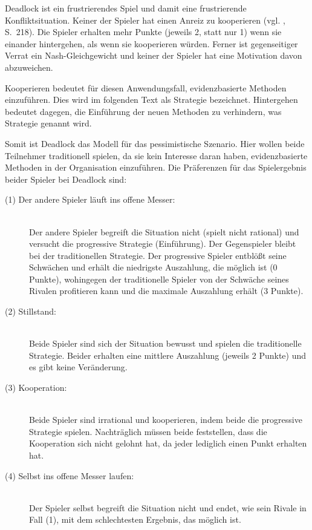 Deadlock ist ein frustrierendes Spiel und damit eine frustrierende Konfliktsituation. Keiner der Spieler hat einen Anreiz
zu kooperieren (vgl. \cite{Poundstone}, S.~218). Die Spieler erhalten mehr Punkte (jeweils 2, statt nur 1) wenn sie einander hintergehen,
als wenn sie kooperieren würden. Ferner ist gegenseitiger Verrat ein Nash-Gleichgewicht und keiner der Spieler hat eine Motivation davon
abzuweichen.

Kooperieren bedeutet für diesen Anwendungsfall, evidenzbasierte Methoden einzuführen. Dies wird im
folgenden Text als \grqq{} Strategie bezeichnet. Hintergehen bedeutet dagegen, die
Einführung der neuen Methoden zu verhindern, was \grqq{} Strategie genannt wird.
 
Somit ist Deadlock das Modell für das pessimistische Szenario. 
Hier wollen beide Teilnehmer traditionell spielen, da sie kein Interesse daran haben, evidenzbasierte Methoden
in der Organisation einzuführen. Die Präferenzen für das Spielergebnis beider Spieler bei Deadlock sind:

\begin{description}

\item[(1) Der andere Spieler läuft ins offene Messer:] \hfill \\
Der andere Spieler begreift die Situation nicht (spielt nicht rational) und versucht die progressive Strategie (Einführung).
Der Gegenspieler bleibt bei der traditionellen Strategie. Der progressive Spieler entblößt seine Schwächen und erhält die
niedrigste Auszahlung, die möglich ist (0 Punkte), wohingegen der traditionelle Spieler von der Schwäche seines Rivalen
profitieren kann und die maximale Auszahlung erhält (3 Punkte).
 
\item[(2) Stillstand:] \hfill \\
Beide Spieler sind sich der Situation bewusst und spielen die traditionelle Strategie.
Beider erhalten eine mittlere Auszahlung (jeweils 2 Punkte) und es gibt keine Veränderung.

\item[(3) Kooperation:] \hfill \\
Beide Spieler sind irrational und kooperieren, indem beide die progressive Strategie spielen.
Nachträglich müssen beide feststellen, dass die Kooperation sich nicht gelohnt hat, da jeder
lediglich einen Punkt erhalten hat.

\item[(4) Selbst ins offene Messer laufen:] \hfill \\
Der Spieler selbst begreift die Situation nicht und endet, wie sein Rivale in Fall (1), mit dem
schlechtesten Ergebnis, das möglich ist.

\end{description}

